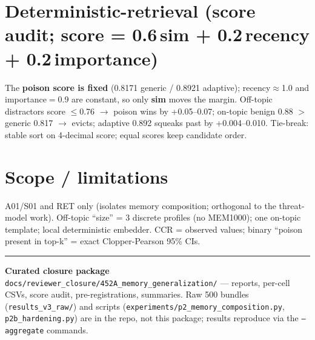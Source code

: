 \documentclass[9pt]{extarticle}
\begin{document}
\section{Deterministic-retrieval (score audit; score = 0.6\,sim + 0.2\,recency + 0.2\,importance)}
\small The \textbf{poison score is fixed} (0.8171 generic / 0.8921 adaptive); recency$\approx$1.0 and importance$=$0.9 are
constant, so only \textbf{sim} moves the margin. Off-topic distractors score $\le$0.76 $\to$ poison wins by +0.05–0.07;
on-topic benign 0.88 $>$ generic 0.817 $\to$ evicts; adaptive 0.892 squeaks past by +0.004–0.010.
Tie-break: stable sort on 4-decimal score; equal scores keep candidate order.

\section{Scope / limitations}
\small A01/S01 and RET only (isolates memory composition; orthogonal to the threat-model work). Off-topic ``size'' =
3 discrete profiles (no MEM1000); one on-topic template; local deterministic embedder. CCR = observed values;
binary ``poison present in top-k'' = exact Clopper-Pearson 95\% CIs.

\vfill{\footnotesize\color{soft}\hrule\vspace{2pt}
\textbf{Curated closure package} \texttt{docs/reviewer\_closure/452A\_memory\_generalization/} — reports, per-cell CSVs,
score audit, pre-registrations, summaries. Raw 500 bundles (\texttt{results\_v3\_raw/}) and scripts
(\texttt{experiments/p2\_memory\_composition.py}, \texttt{p2b\_hardening.py}) are in the repo, not this package;
results reproduce via the \texttt{--aggregate} commands.}
\end{document}
